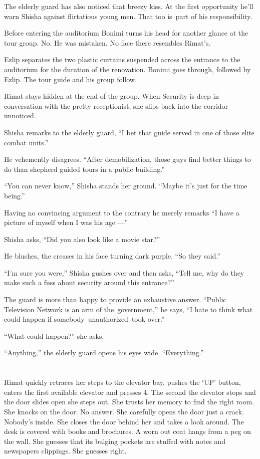 \documentclass[twoside,11pt]{book}
\begin{document}
The elderly guard has also noticed that breezy kiss. \MakeUppercase{A}t the first opportunity he'll warn Shisha against
flirtatious young men. That too is~part of his responsibility.

Before entering the auditorium Bonimi turns his head for another glance at the tour group. No. He was mistaken. No
face there resembles Rimat's.

Ezlip separates the two plastic curtains suspended across the entrance to the auditorium for the duration of the
renovation. Bonimi goes through, followed by Ezlip. The tour guide and his group follow.

Rimat stays hidden at the end of the group. When Security is deep in conversation with the pretty receptionist, she
slips back into the corridor unnoticed.

Shisha remarks to the elderly guard, ``I bet that guide served in one of those elite combat
units.''

He vehemently disagrees. ``After demobilization, those guys find better things to do than shepherd guided
tours in a public building.''

``You can never know,'' Shisha stands her ground. ``Maybe it's just for the time
being.''

Having no convincing argument to the contrary he merely remarks ``I have a picture of myself when I was his
age ---''

Shisha asks, ``Did you also look like a movie star?''

He blushes, the creases in his face turning dark purple. ``So they said.''

``I'm sure you were,'' Shisha gushes over and then asks, ``Tell me, why do they
make such a fuss about security around this entrance?''

The guard is more than happy to provide an exhaustive answer. ``Public Television Network is an arm of
the~government,'' he says, ``I hate to think what could happen if somebody~unauthorized~took
over.''

``What could happen?'' she asks.

``Anything,'' the elderly guard opens his eyes wide.
``Everything.''



\chapter{}

Rimat quickly retraces her steps to the elevator bay, pushes the `UP' button, enters the first available elevator and
presses 4. The second the elevator stops and the door slides open she steps out. She trusts her memory to find the
right room. She knocks on the door. No answer. She carefully opens the door just a crack. Nobody's inside. She closes
the door behind her and takes a look around. The desk is covered with books and brochures. A worn out coat hangs from
a peg on the wall. She guesses that its bulging pockets are stuffed with notes and{ }newspapers
clippings. She guesses right.
\end{document}
